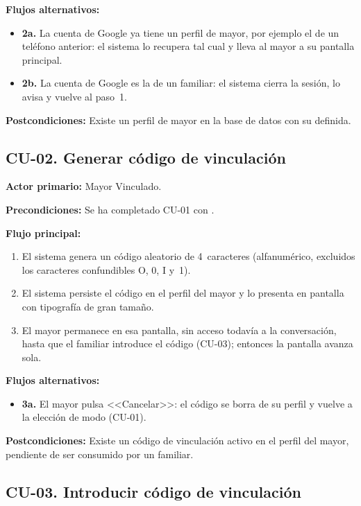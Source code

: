 \noindent\textbf{Flujos alternativos:}
\begin{itemize}[nosep]
    \item \textbf{2a.} La cuenta de Google ya tiene un perfil de mayor, por ejemplo el de un teléfono anterior: el sistema lo recupera tal cual y lleva al mayor a su pantalla principal.
    \item \textbf{2b.} La cuenta de Google es la de un familiar: el sistema cierra la sesión, lo avisa y vuelve al paso~1.
\end{itemize}

\noindent\textbf{Postcondiciones:} Existe un perfil de mayor en la base de datos con su  definida.

\bigskip

\subsection*{CU-02. Generar código de vinculación}

\noindent\textbf{Actor primario:} Mayor Vinculado.

\noindent\textbf{Precondiciones:} Se ha completado CU-01 con .

\noindent\textbf{Flujo principal:}
\begin{enumerate}[nosep]
    \item El sistema genera un código aleatorio de 4~caracteres (alfanumérico, excluidos los caracteres confundibles O, 0, I y~1).
    \item El sistema persiste el código en el perfil del mayor y lo presenta en pantalla con tipografía de gran tamaño.
    \item El mayor permanece en esa pantalla, sin acceso todavía a la conversación, hasta que el familiar introduce el código (CU-03); entonces la pantalla avanza sola.
\end{enumerate}

\noindent\textbf{Flujos alternativos:}
\begin{itemize}[nosep]
    \item \textbf{3a.} El mayor pulsa <<Cancelar>>: el código se borra de su perfil y vuelve a la elección de modo (CU-01).
\end{itemize}

\noindent\textbf{Postcondiciones:} Existe un código de vinculación activo en el perfil del mayor, pendiente de ser consumido por un familiar.

\bigskip

\subsection*{CU-03. Introducir código de vinculación}

